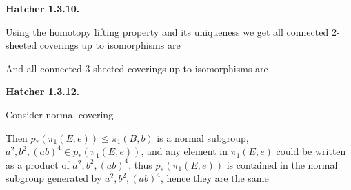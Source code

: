 \documentclass[../main.tex]{subfiles}
\begin{document}
\textbf{Hatcher 1.3.10.} \par
Using the homotopy lifting property and its uniqueness we get all connected $2$-sheeted coverings up to isomorphisms are \par
\vspace{2cm}
\iffalse
\begin{center}
\begin{tikzpicture}
\begin{scope}[decoration={markings,mark=at position 0.5 with {\arrow{>}}}]
\draw[postaction={decorate}] (0,0) to [out=60,in=-180] (1,1) node [above] {\footnotesize $a$} to [out=0,in=120] (2,0);
\draw[postaction={decorate}] (0,0) to [out=-60,in=-180] (1,-1) node [below] {\footnotesize $b$} to [out=0,in=-120] (2,0);
\draw[postaction={decorate}] (2,0) to [out=135,in=0] (1,0.5) node [below] {\footnotesize $a$} to [out=-180,in=45] (0,0);
\draw[postaction={decorate}] (2,0) to [out=-135,in=0] (1,-0.5) node [above] {\footnotesize $b$} to [out=-180,in=-45] (0,0);
\end{scope}
\end{tikzpicture}
\begin{tikzpicture}
\begin{scope}[decoration={markings,mark=at position 0.5 with {\arrow{>}}}]
\draw[postaction={decorate}] (0,0) to [out=30,in=-180] (1,0.3) node [above] {\footnotesize $a$} to [out=0,in=150] (2,0);
\draw[postaction={decorate}] (0,0) to [out=-30,in=-180] (1,-0.3) node [below] {\footnotesize $a$} to [out=0,in=-150] (2,0);
\draw[postaction={decorate}] (-0.3,0) circle (0.3);
\node [right] (-0.6,0) {\footnotesize $b$};
\draw[postaction={decorate},rotate=180] (-2.3,0) circle (0.3);
\node [right] (2.6,0) {\footnotesize $b$};
\end{scope}
\end{tikzpicture}
\end{center}
\fi
And all connected $3$-sheeted coverings up to isomorphisms are \par
\vspace{3cm}
\textbf{Hatcher 1.3.12.} \par
Consider normal covering \par
\vspace{3cm}
Then $p_{*}(\pi_1(E,e))\leq \pi_1(B,b)$ is a normal subgroup, $a^2,b^2,(ab)^4\in p_{*}(\pi_1(E,e))$, and any element in $\pi_1(E,e)$ could be written as a product of $a^2,b^2,(ab)^4$, thus $p_{*}(\pi_1(E,e))$ is contained in the normal subgroup generated by $a^2,b^2,(ab)^4$, hence they are the same \par
\end{document}
